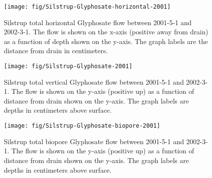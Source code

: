 \documentclass[a4paper]{article}
\begin{document}
\begin{figure}[htbp]
  \centering
  \texttt{[image: fig/Silstrup-Glyphosate-horizontal-2001]}
  
  \caption{Silstrup total horizontal Glyphosate flow between 2001-5-1 and
    2002-3-1.  The flow is shown on the x-axis (positive away from
    drain) as a function of depth shown on the y-axis.  The graph
    labels are the distance from drain in centimeters.}
  \label{fig:Silstrup-Glyphosate-2001-horizontal}
\end{figure}\FloatBarrier

\begin{figure}[htbp]
  \centering
  \texttt{[image: fig/Silstrup-Glyphosate-2001]}
  
  \caption{Silstrup total vertical Glyphosate flow between 2001-5-1 and
    2002-3-1.  The flow is shown on the y-axis (positive up) as a
    function of distance from drain shown on the y-axis.  The graph
    labels are depths in centimeters above surface.}
  \label{fig:Silstrup-Glyphosate-2001-vertical}
\end{figure}\FloatBarrier

\begin{figure}[htbp]
  \centering
  \texttt{[image: fig/Silstrup-Glyphosate-biopore-2001]}
  
  \caption{Silstrup total biopore Glyphosate flow between 2001-5-1 and
    2002-3-1.  The flow is shown on the y-axis (positive up) as a
    function of distance from drain shown on the y-axis.  The graph
    labels are depths in centimeters above surface.}
  \label{fig:Silstrup-Glyphosate-biopore-2001}
\end{figure}\FloatBarrier
\end{document}
